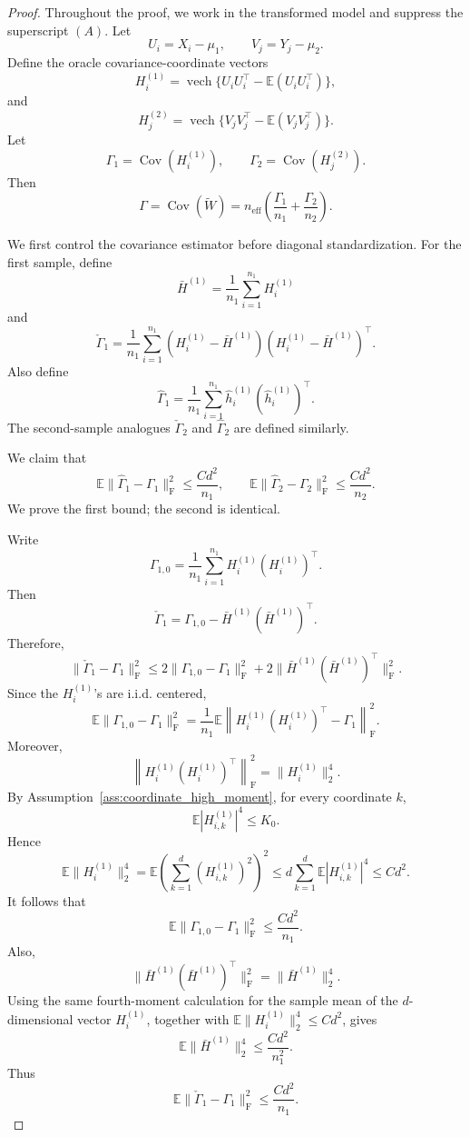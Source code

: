 \documentclass[
  12pt]{article}
\theoremstyle{plain}
\theoremstyle{definition}
\theoremstyle{remark}
\begin{document}
\begin{proof}
Throughout the proof, we work in the transformed model and suppress the
superscript \((A)\). Let
\[
U_i=X_i-\mu_1,
\qquad
V_j=Y_j-\mu_2.
\]
Define the oracle covariance-coordinate vectors
\[
H_i^{(1)}
=
\operatorname{vech}
\{U_iU_i^\top-\mathbb E(U_iU_i^\top)\},
\]
and
\[
H_j^{(2)}
=
\operatorname{vech}
\{V_jV_j^\top-\mathbb E(V_jV_j^\top)\}.
\]
Let
\[
\Gamma_1=\operatorname{Cov}(H_i^{(1)}),
\qquad
\Gamma_2=\operatorname{Cov}(H_j^{(2)}).
\]
Then
\[
\Gamma
=
\operatorname{Cov}(\widetilde W)
=
n_{\mathrm{eff}}
\left(
\frac{\Gamma_1}{n_1}
+
\frac{\Gamma_2}{n_2}
\right).
\]

We first control the covariance estimator before diagonal standardization.
For the first sample, define
\[
\bar H^{(1)}
=
\frac1{n_1}\sum_{i=1}^{n_1}H_i^{(1)}
\]
and
\[
\check\Gamma_1
=
\frac1{n_1}
\sum_{i=1}^{n_1}
(H_i^{(1)}-\bar H^{(1)})(H_i^{(1)}-\bar H^{(1)})^\top.
\]
Also define
\[
\widehat\Gamma_1
=
\frac1{n_1}
\sum_{i=1}^{n_1}
\widehat h_i^{(1)}(\widehat h_i^{(1)})^\top.
\]
The second-sample analogues \(\check\Gamma_2\) and \(\widehat\Gamma_2\) are
defined similarly.

We claim that
\[
\mathbb E\|\widehat\Gamma_1-\Gamma_1\|_{\mathrm F}^2
\le
\frac{Cd^2}{n_1},
\qquad
\mathbb E\|\widehat\Gamma_2-\Gamma_2\|_{\mathrm F}^2
\le
\frac{Cd^2}{n_2}.
\]
We prove the first bound; the second is identical.

Write
\[
\Gamma_{1,0}
=
\frac1{n_1}\sum_{i=1}^{n_1}
H_i^{(1)}(H_i^{(1)})^\top.
\]
Then
\[
\check\Gamma_1
=
\Gamma_{1,0}
-
\bar H^{(1)}(\bar H^{(1)})^\top.
\]
Therefore,
\[
\|\check\Gamma_1-\Gamma_1\|_{\mathrm F}^2
\le
2\|\Gamma_{1,0}-\Gamma_1\|_{\mathrm F}^2
+
2\|\bar H^{(1)}(\bar H^{(1)})^\top\|_{\mathrm F}^2.
\]
Since the \(H_i^{(1)}\)'s are i.i.d. centered,
\[
\mathbb E\|\Gamma_{1,0}-\Gamma_1\|_{\mathrm F}^2
=
\frac1{n_1}
\mathbb E
\left\|
H_i^{(1)}(H_i^{(1)})^\top-\Gamma_1
\right\|_{\mathrm F}^2.
\]
Moreover,
\[
\left\|
H_i^{(1)}(H_i^{(1)})^\top
\right\|_{\mathrm F}^2
=
\|H_i^{(1)}\|_2^4.
\]
By Assumption~\ref{ass:coordinate_high_moment}, for every coordinate \(k\),
\[
\mathbb E|H_{i,k}^{(1)}|^4\le K_0.
\]
Hence
\[
\mathbb E\|H_i^{(1)}\|_2^4
=
\mathbb E
\left(
\sum_{k=1}^d (H_{i,k}^{(1)})^2
\right)^2
\le
d\sum_{k=1}^d
\mathbb E|H_{i,k}^{(1)}|^4
\le
Cd^2.
\]
It follows that
\[
\mathbb E\|\Gamma_{1,0}-\Gamma_1\|_{\mathrm F}^2
\le
\frac{Cd^2}{n_1}.
\]
Also,
\[
\|\bar H^{(1)}(\bar H^{(1)})^\top\|_{\mathrm F}^2
=
\|\bar H^{(1)}\|_2^4.
\]
Using the same fourth-moment calculation for the sample mean of the
\(d\)-dimensional vector \(H_i^{(1)}\), together with
\(\mathbb E\|H_i^{(1)}\|_2^4\le Cd^2\), gives
\[
\mathbb E\|\bar H^{(1)}\|_2^4
\le
\frac{Cd^2}{n_1^2}.
\]
Thus
\[
\mathbb E\|\check\Gamma_1-\Gamma_1\|_{\mathrm F}^2
\le
\frac{Cd^2}{n_1}.
\]


\end{proof}
\end{document}
